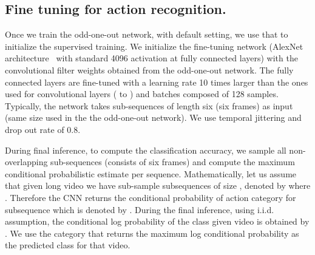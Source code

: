 \subsection{Fine tuning for action recognition.}
Once we train the odd-one-out network, with default setting, we use that to initialize the supervised training. 
We initialize the fine-tuning network (AlexNet architecture~\cite{Donahue13} with standard 4096 activation at fully connected layers) with the convolutional filter weights obtained from the odd-one-out network. 
The fully connected layers are fine-tuned with a learning rate 10 times larger than the ones used for convolutional layers ( to ) and batches composed of 128 samples. 
Typically, the network takes sub-sequences of length six (six frames) as input (same size used in the the odd-one-out network).
We use temporal jittering and drop out rate of 0.8. 

During final inference, to compute the classification accuracy, we sample all non-overlapping sub-sequences (consists of six frames) and compute the maximum conditional probabilistic estimate per sequence. Mathematically, let us assume that given long video  we have sub-sample  subsequences of size , denoted by  where . 
Therefore the CNN returns the conditional probability of action category  for subsequence  which is denoted by .  
During the final inference, using i.i.d. assumption, the conditional log probability of the class  given video  is obtained by . 
We use the category that returns the maximum log conditional probability as the predicted class for that video.
